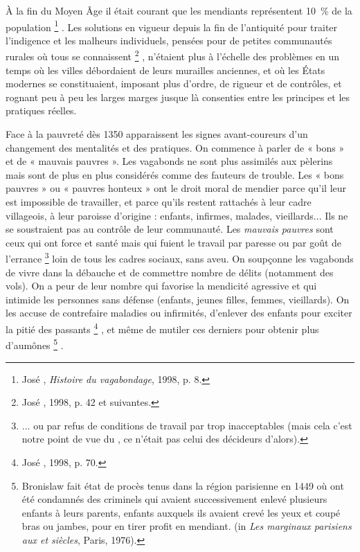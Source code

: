  À la fin du Moyen Âge il était courant que les mendiants représentent 10~\% de la population%
\footnote{José , \emph{Histoire du vagabondage}, 1998, p. 8.}%
. Les solutions en vigueur depuis la fin de l'antiquité pour traiter l'indigence et les malheurs individuels, pensées pour de petites communautés rurales où tous se connaissent%
\footnote{José , 1998, p. 42 et suivantes.}%
, n'étaient plus à l'échelle des problèmes en un temps où les villes débordaient de leurs murailles anciennes, et où les États modernes se constituaient, imposant plus d'ordre, de rigueur et de contrôles, et rognant peu à peu les larges marges jusque là consenties entre les principes et les pratiques réelles. 

 Face à la pauvreté dès 1350 apparaissent les signes avant-coureurs d'un changement des mentalités et des pratiques. On commence à parler de « {bons} » et de « {mauvais pauvres} ». Les vagabonds ne sont plus assimilés aux pèlerins mais sont de plus en plus considérés comme des fauteurs de trouble. Les « {bons pauvres} » ou « {pauvres honteux} » ont le droit moral de mendier parce qu'il leur est impossible de travailler, et parce qu'ils restent rattachés à leur cadre villageois, à leur paroisse d'origine : enfants, infirmes, malades, vieillards... Ils ne se soustraient pas au contrôle de leur communauté. Les \emph{mauvais pauvres} sont ceux qui ont force et santé mais qui fuient le travail par paresse ou par goût de l'errance%
\footnote{... ou par refus de conditions de travail par trop inacceptables (mais cela c'est notre point de vue du , ce n'était pas celui des décideurs d'alors).} 
loin de tous les cadres sociaux, sans aveu. On soupçonne les vagabonds de vivre dans la débauche et de commettre nombre de délits (notamment des vols). On a peur de leur nombre qui favorise la mendicité agressive et qui intimide les personnes sans défense (enfants, jeunes filles, femmes, vieillards). On les accuse de contrefaire maladies ou infirmités, d'enlever des enfants pour exciter la pitié des passants%
\footnote{José , 1998, p. 70.}%
, et même de mutiler ces derniers pour obtenir plus d'aumônes%
\footnote{Bronislaw  fait état de procès tenus dans la région parisienne en 1449 où ont été condamnés des criminels qui avaient successivement enlevé plusieurs enfants à leurs parents, enfants auxquels ils avaient crevé les yeux et coupé bras ou jambes, pour en tirer profit en mendiant. (in \emph{Les marginaux parisiens aux  et  siècles}, Paris, 1976).}%
. 

